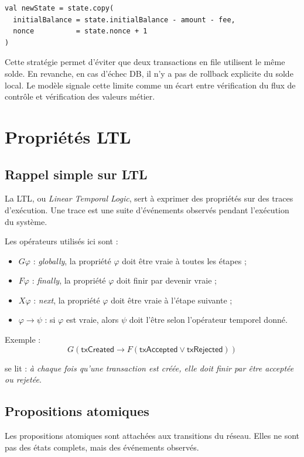 \documentclass[11pt,a4paper]{article}
\newcommand{\atom}[1]{\mathsf{#1}}
\begin{document}
\begin{lstlisting}
val newState = state.copy(
  initialBalance = state.initialBalance - amount - fee,
  nonce          = state.nonce + 1
)
\end{lstlisting}

Cette stratégie permet d'éviter que deux transactions en file utilisent le même solde. En revanche, en cas d'échec DB, il n'y a pas de rollback explicite du solde local. Le modèle signale cette limite comme un écart entre vérification du flux de contrôle et vérification des valeurs métier.

\section{Propriétés LTL}

\subsection{Rappel simple sur LTL}

La LTL, ou \emph{Linear Temporal Logic}, sert à exprimer des propriétés sur des traces d'exécution. Une trace est une suite d'événements observés pendant l'exécution du système.

Les opérateurs utilisés ici sont :
\begin{itemize}
  \item $G\varphi$ : \emph{globally}, la propriété $\varphi$ doit être vraie à toutes les étapes ;
  \item $F\varphi$ : \emph{finally}, la propriété $\varphi$ doit finir par devenir vraie ;
  \item $X\varphi$ : \emph{next}, la propriété $\varphi$ doit être vraie à l'étape suivante ;
  \item $\varphi \rightarrow \psi$ : si $\varphi$ est vraie, alors $\psi$ doit l'être selon l'opérateur temporel donné.
\end{itemize}

Exemple :
\[
  G(\atom{txCreated} \rightarrow F(\atom{txAccepted} \lor \atom{txRejected}))
\]

se lit : \emph{à chaque fois qu'une transaction est créée, elle doit finir par être acceptée ou rejetée}.

\subsection{Propositions atomiques}

Les propositions atomiques sont attachées aux transitions du réseau. Elles ne sont pas des états complets, mais des événements observés.
\end{document}
